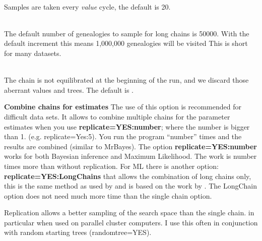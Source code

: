 \begin{description}
\item{}\\
Samples are taken every  \textsl{value} cycle, the default is 20. 

\item{}\\
The default number of genealogies to sample for long chains is 50000. With the default increment this means
1,000,000 genealogies will be visited
This is short for many datasets.
\item{}\\
The chain is not equilibrated at the beginning of the run, and we discard those aberrant values and trees. The default is {}.

\item{\bf Combine chains for estimates}
The use of this option is recommended for difficult
data sets. It allows to combine multiple chains for the parameter 
estimates when you use {\bf replicate=YES:number}; where the number is bigger than 1. (e.g. replicate=Yes:5). 
You run the program ``number'' times and the results are combined (similar to MrBayes).
The option  {\bf replicate=YES:number} works for both Bayesian inference and Maximum Likelihood. The work is number times more than without replication.
For ML there is another option:  {\bf replicate=YES:LongChains} that allows the combination of long chains only, this is the same method as used by  \cite{kuhner:1995:eep} and is based on the work by \cite{geyer1991-t}. The LongChain option does not need much more time than the single chain option.

Replication allows a better sampling of the search space than the single chain. in particular when used on parallel cluster computers. I use this often in conjunction with random starting trees (randomtree=YES). 


\end{description}
